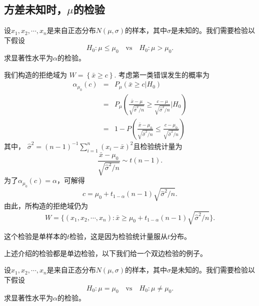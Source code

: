 \subsection{方差未知时，$\mu$的检验}
\begin{example}
    设$x_1,x_2,\cdots,x_n$是来自正态分布$N(\mu,\sigma)$的样本，其中$\sigma$是未知的。我们需要检验以下假设
    $$
    H_0: \mu \leq \mu_0 \quad \text{vs} \quad H_0: \mu > \mu_0.    $$
    求显著性水平为$\alpha$的检验。
\end{example}
\begin{solution}
    我们构造的拒绝域为
    $
    W = \left\{\bar{x} \geq c\right\}.
    $
    考虑第一类错误发生的概率为
    \begin{eqnarray*}
        \alpha_{\mu_0}(c) &=& P_{\mu}(\bar{x} \geq c|H_0) \\
        &=& P_{\mu}\left(\frac{\bar{x} - \mu}{\sqrt{\hat{\sigma}^2/n}} \geq \frac{c - \mu}{\sqrt{\hat{\sigma}^2/n}}|H_0\right)\\
        &=& 1- P\left(\frac{\bar{x} - \mu_0}{\sqrt{\hat{\sigma}^2/n}}\leq \frac{c - \mu_0}{\sqrt{\hat{\sigma}^2/n}}\right)
    \end{eqnarray*}
    其中， $\hat{\sigma}^2 = (n-1)^{-1}\sum_{i=1}^n (x_i - \bar{x})^2$且检验统计量为
    $$
    \frac{\bar{x} - \mu_0}{\sqrt{\hat{\sigma}^2/n}} \sim t(n-1).
    $$
    为了$ \alpha_{\mu_0}(c) = \alpha$，可解得
    $$
    c = \mu_0 + t_{1-\alpha}(n-1)\sqrt{\hat{\sigma}^2/n}.
    $$
    由此，所构造的拒绝域仍为
    $$
     W = \{(x_1,x_2,\cdots,x_n): \bar{x} \geq   \mu_0 + t_{1-\alpha}(n-1)\sqrt{\hat{\sigma}^2/n}\}.
    $$
\end{solution}
\begin{remark}
    这个检验是单样本的$t$检验，这是因为检验统计量服从$t$分布。
\end{remark}
\newpage
上述介绍的检验都是单边检验，以下我们给一个双边检验的例子。
\begin{example} \label{ex:chap22_one_sample_mean_t}
    设$x_1,x_2,\cdots,x_n$是来自正态分布$N(\mu,\sigma)$的样本，其中$\sigma$是未知的。我们需要检验以下假设
    $$
    H_0: \mu = \mu_0 \quad \text{vs} \quad H_0: \mu \neq \mu_0.    $$
    求显著性水平为$\alpha$的检验。
\end{example}
